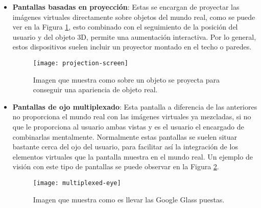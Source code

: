 \begin{itemize}

  \newpage

  \item \textbf{Pantallas basadas en proyección}: Estas se encargan de proyectar las imágenes virtuales directamente sobre objetos del mundo real, como se puede ver en la Figura \ref{figura-pantalla-proyeccion}, esto combinado con el seguimiento de la posición del usuario y del objeto 3D, permite una aumentación interactiva. Por lo general, estos dispositivos suelen incluir un proyector montado en el techo o paredes.

  \begin{figure}[h]
    \centering
    \texttt{[image: projection-screen]}
    \caption{Imagen que muestra como sobre un objeto se proyecta para conseguir una apariencia de objeto real.\protect\footnotemark}
    \label{figura-pantalla-proyeccion}
  \end{figure}


  \item \textbf{Pantallas de ojo multiplexado}: Esta pantalla a diferencia de las anteriores no proporciona el mundo real con las imágenes virtuales ya mezcladas, si no que le proporciona al usuario ambas vistas y es el usuario el encargado de combinarlas mentalmente. Normalmente estas pantallas se suelen situar bastante cerca del ojo del usuario, para facilitar así la integración de los elementos virtuales que la pantalla muestra en el mundo real. Un ejemplo de visión con este tipo de pantallas se puede observar en la Figura \ref{figura-ojo-multiplexado}.

  \begin{figure}[h]
    \centering
    \texttt{[image: multiplexed-eye]}
    \caption{Imagen que muestra como es llevar las Google Glass puestas.\protect\footnotemark}
    \label{figura-ojo-multiplexado}
  \end{figure}


\end{itemize}

